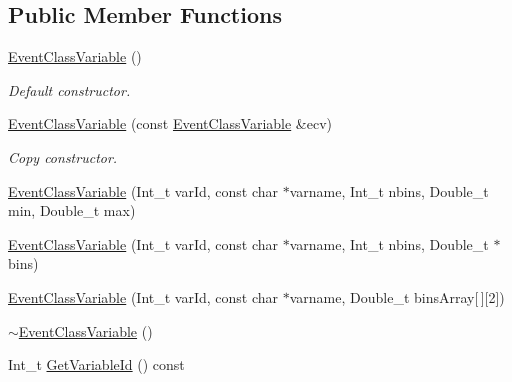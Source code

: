 \subsection*{Public Member Functions}
\begin{DoxyCompactItemize}
\item 
\mbox{\label{classQn_1_1EventClassVariable_aa733d204603ec159a936c1e92b2ba7e5}} 
\mbox{\hyperlink{classQn_1_1EventClassVariable_aa733d204603ec159a936c1e92b2ba7e5}{Event\+Class\+Variable}} ()
\begin{DoxyCompactList}\small\item\em Default constructor. \end{DoxyCompactList}\item 
\mbox{\label{classQn_1_1EventClassVariable_a7b8a5c162d249c21010237a6cd5553ef}} 
\mbox{\hyperlink{classQn_1_1EventClassVariable_a7b8a5c162d249c21010237a6cd5553ef}{Event\+Class\+Variable}} (const \mbox{\hyperlink{classQn_1_1EventClassVariable}{Event\+Class\+Variable}} \&ecv)
\begin{DoxyCompactList}\small\item\em Copy constructor. \end{DoxyCompactList}\item 
\mbox{\hyperlink{classQn_1_1EventClassVariable_af1700dd291428bf69331c8ba9d092b7e}{Event\+Class\+Variable}} (Int\+\_\+t var\+Id, const char $\ast$varname, Int\+\_\+t nbins, Double\+\_\+t min, Double\+\_\+t max)
\item 
\mbox{\hyperlink{classQn_1_1EventClassVariable_aadc0846404621e79c573b98e7747039b}{Event\+Class\+Variable}} (Int\+\_\+t var\+Id, const char $\ast$varname, Int\+\_\+t nbins, Double\+\_\+t $\ast$bins)
\item 
\mbox{\hyperlink{classQn_1_1EventClassVariable_a260ffe64770085c450a4666670760931}{Event\+Class\+Variable}} (Int\+\_\+t var\+Id, const char $\ast$varname, Double\+\_\+t bins\+Array\mbox{[}$\,$\mbox{]}\mbox{[}2\mbox{]})
\item 
\mbox{\hyperlink{classQn_1_1EventClassVariable_a8143fbc405d4946f2bfa34fb965f3a0d}{$\sim$\+Event\+Class\+Variable}} ()
\item 
\mbox{\label{classQn_1_1EventClassVariable_aff7924928b5c2e6e31bcfd9ddc1c63d1}} 
Int\+\_\+t \mbox{\hyperlink{classQn_1_1EventClassVariable_aff7924928b5c2e6e31bcfd9ddc1c63d1}{Get\+Variable\+Id}} () const

\end{DoxyCompactItemize}
